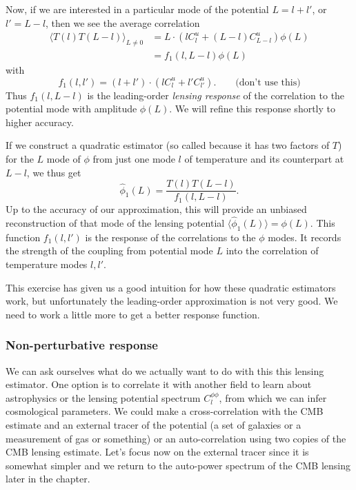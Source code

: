 Now, if we are interested in a particular mode of the potential $L = l+l'$, or $l' = L-l$, then we see the average correlation
\begin{align}
  \langle T(l) T(L-l) \rangle_{L \neq 0 } &=  L \cdot (l C^u_l + (L-l) C^u_{L-l}) \phi(L) \\ \nonumber
  &= f_1(l,L-l) \phi(L)
\end{align}
with 
\begin{equation}
  f_1(l,l')  = (l+l') \cdot (l C^u_l + l' C^u_{l'}).   \qquad{\mbox{(don't use this)}}
\end{equation}
Thus $f_1(l,L-l)$ is the leading-order \textit{lensing response} of the correlation to the potential mode with amplitude $\phi(L)$.  We will refine this response shortly to higher accuracy.

If we construct a quadratic estimator (so called because it has two factors of $T$) for the $L$ mode of $\phi$ from just one mode $l$ of temperature and its counterpart at $L-l$, we thus get
\begin{equation}
  \hat\phi_{1}(L) %
  = \frac{T(l) T(L-l)}{f_1(l,L-l)}.
\end{equation}
Up to the accuracy of our approximation, this will provide an unbiased reconstruction of that mode of the lensing potential $\langle \hat\phi_{1}(L) \rangle = \phi(L)$.  This function $f_1(l,l')$ is the response of the correlations to the $\phi$ modes.  It records the strength of the coupling from potential mode $L$ into the correlation of temperature modes $l,l'$.

This exercise has given us a good intuition for how these quadratic estimators work, but unfortunately the leading-order approximation is not very good.  We need to work a little more to get a better response function.

\subsubsection{Non-perturbative response}

We can ask ourselves what do we actually want to do with this this lensing estimator.  One option is to correlate it with another field to learn about astrophysics or the lensing potential spectrum $C_l^{\phi \phi}$, from which we can infer cosmological parameters.  We could make a cross-correlation with the CMB estimate and an external tracer of the potential (a set of galaxies or a measurement of gas or something) or an auto-correlation using two copies of the CMB lensing estimate.  Let's focus now on the external tracer since it is somewhat simpler and we return to the auto-power spectrum of the CMB lensing later in the chapter.

